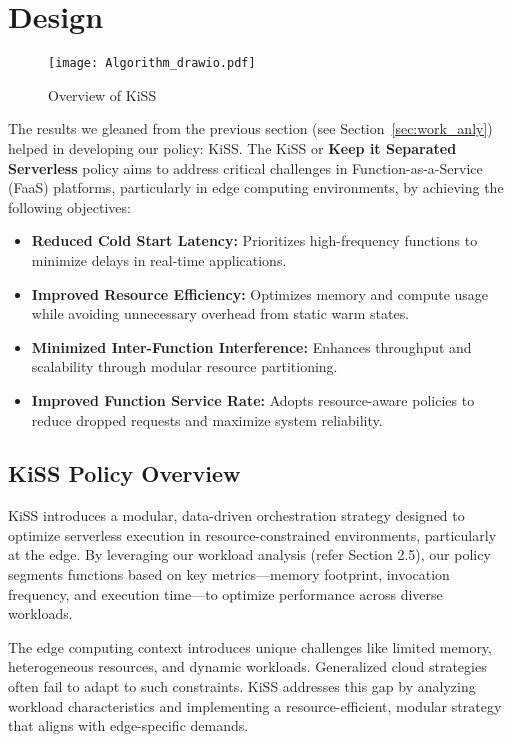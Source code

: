 \section{Design}\label{sec:design}



\begin{figure*}[t]
    \centering
    \texttt{[image: Algorithm\_drawio.pdf]}
    \caption{Overview of KiSS}
    \label{fig:overview}
\end{figure*}


The results we gleaned from the previous section (see Section~\ref{sec:work_anly}) helped in developing our policy: KiSS. The KiSS or \textbf{Keep it Separated Serverless} policy aims to address critical challenges in Function-as-a-Service (FaaS) platforms, particularly in edge computing environments, by achieving the following objectives:

\begin{itemize}
    \item \textbf{Reduced Cold Start Latency:} Prioritizes high-frequency functions to minimize delays in real-time applications.
    \item \textbf{Improved Resource Efficiency:} Optimizes memory and compute usage while avoiding unnecessary overhead from static warm states.
    \item \textbf{Minimized Inter-Function Interference:} Enhances throughput and scalability through modular resource partitioning.
    \item \textbf{Improved Function Service Rate:} Adopts resource-aware policies to reduce dropped requests and maximize system reliability.
\end{itemize}


\subsection{KiSS Policy Overview}

KiSS introduces a modular, data-driven orchestration strategy designed to optimize serverless execution in resource-constrained environments, particularly at the edge. By leveraging our workload analysis (refer Section 2.5), our policy segments functions based on key metrics—memory footprint, invocation frequency, and execution time—to optimize performance across diverse workloads.

The edge computing context introduces unique challenges like limited memory, heterogeneous resources, and dynamic workloads. Generalized cloud strategies often fail to adapt to such constraints. KiSS addresses this gap by analyzing workload characteristics and implementing a resource-efficient, modular strategy that aligns with edge-specific demands.

